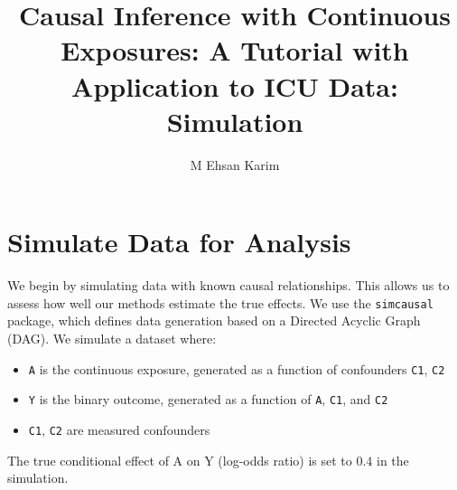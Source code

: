 \documentclass[
]{article}
\title{Causal Inference with Continuous Exposures: A Tutorial with
Application to ICU Data: Simulation}
\author{M Ehsan Karim}
\date{}
\providecommand{\tightlist}{%
  \setlength{\itemsep}{0pt}\setlength{\parskip}{0pt}}
\begin{document}
\maketitle

\section{Simulate Data for Analysis}\label{simulate-data-for-analysis}

We begin by simulating data with known causal relationships. This allows
us to assess how well our methods estimate the true effects. We use the
\texttt{simcausal} package, which defines data generation based on a
Directed Acyclic Graph (DAG). We simulate a dataset where:

\begin{itemize}
\tightlist
\item
  \texttt{A} is the continuous exposure, generated as a function of
  confounders \texttt{C1}, \texttt{C2}
\item
  \texttt{Y} is the binary outcome, generated as a function of
  \texttt{A}, \texttt{C1}, and \texttt{C2}
\item
  \texttt{C1}, \texttt{C2} are measured confounders
\end{itemize}

The true conditional effect of A on Y (log-odds ratio) is set to \(0.4\)
in the simulation.
\end{document}
